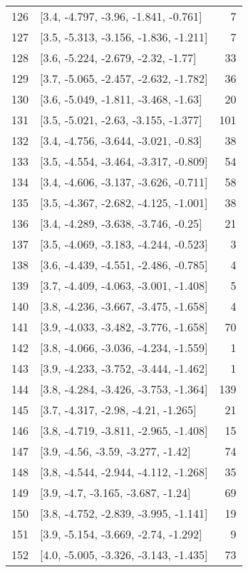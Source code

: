 \documentclass{article}%
\begin{document}
\begin{longtable}{llr}
126 &   [3.4, -4.797, -3.96, -1.841, -0.761] &       7 \\
127 &  [3.5, -5.313, -3.156, -1.836, -1.211] &       7 \\
128 &    [3.6, -5.224, -2.679, -2.32, -1.77] &      33 \\
129 &  [3.7, -5.065, -2.457, -2.632, -1.782] &      36 \\
130 &   [3.6, -5.049, -1.811, -3.468, -1.63] &      20 \\
131 &   [3.5, -5.021, -2.63, -3.155, -1.377] &     101 \\
132 &   [3.4, -4.756, -3.644, -3.021, -0.83] &      38 \\
133 &  [3.5, -4.554, -3.464, -3.317, -0.809] &      54 \\
134 &  [3.4, -4.606, -3.137, -3.626, -0.711] &      58 \\
135 &  [3.5, -4.367, -2.682, -4.125, -1.001] &      38 \\
136 &   [3.4, -4.289, -3.638, -3.746, -0.25] &      21 \\
137 &  [3.5, -4.069, -3.183, -4.244, -0.523] &       3 \\
138 &  [3.6, -4.439, -4.551, -2.486, -0.785] &       4 \\
139 &  [3.7, -4.409, -4.063, -3.001, -1.408] &       5 \\
140 &  [3.8, -4.236, -3.667, -3.475, -1.658] &       4 \\
141 &  [3.9, -4.033, -3.482, -3.776, -1.658] &      70 \\
142 &  [3.8, -4.066, -3.036, -4.234, -1.559] &       1 \\
143 &  [3.9, -4.233, -3.752, -3.444, -1.462] &       1 \\
144 &  [3.8, -4.284, -3.426, -3.753, -1.364] &     139 \\
145 &    [3.7, -4.317, -2.98, -4.21, -1.265] &      21 \\
146 &  [3.8, -4.719, -3.811, -2.965, -1.408] &      15 \\
147 &     [3.9, -4.56, -3.59, -3.277, -1.42] &      74 \\
148 &  [3.8, -4.544, -2.944, -4.112, -1.268] &      35 \\
149 &     [3.9, -4.7, -3.165, -3.687, -1.24] &      69 \\
150 &  [3.8, -4.752, -2.839, -3.995, -1.141] &      19 \\
151 &   [3.9, -5.154, -3.669, -2.74, -1.292] &       9 \\
152 &  [4.0, -5.005, -3.326, -3.143, -1.435] &      73 \\

\end{longtable}
\end{document}
